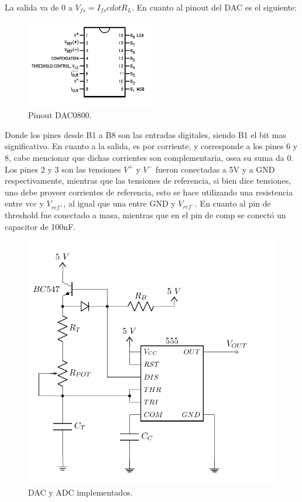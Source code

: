 La salida va de 0 a $V_{fs}= I_{fs}cdot R_L$. En cuanto al pinout del DAC es el siguiente:
\begin{figure}[H]
	\centering
	\includegraphics[width=0.5\textwidth]{ImagenesEjercicio1/dacpinout.png}
\caption{Pinout DAC0800.}
	\label{fig:dapinout}
\end{figure}
Donde los pines desde B1 a B8 son las entradas digitales, siendo B1 el bit mas significativo. En cuanto a la salida, es por corriente, y corresponde a los pines 6 y 8, cabe mencionar que dichas corrientes son complementaria, osea su suma da 0. Los pines 2 y 3 son las tensiones $V^+$ y $V^-$ fueron conectadas a 5V y a GND respectivamente, mientras que las tensiones de referencia, si bien dice tensiones, uno debe proveer corrientes de referencia, esto se hace utilizando una resistencia entre vcc y $V_{ref^+}$, al igual que una entre GND y $V_{ref^-}$. En cuanto al pin de threshold fue conectado a masa, mientras que en el pin de comp se conectó un capacitor de 100nF.

\begin{figure}[H]
\centering
\includegraphics[width=\linewidth, page = 2]{ImagenesEjercicio1/Components.pdf}
\caption{DAC y ADC implementados.}
\label{fig:dacydac}
\end{figure}

